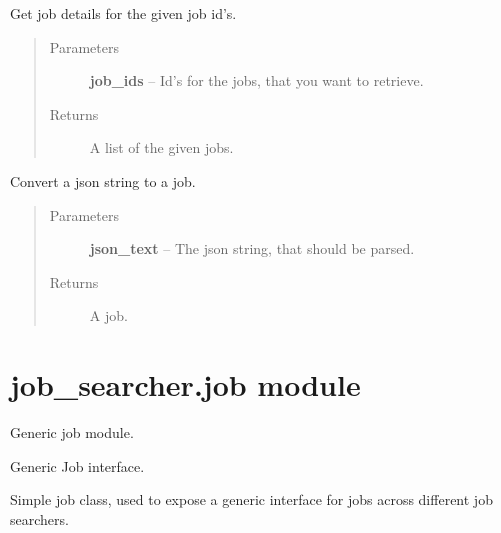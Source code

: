 \documentclass[letterpaper,10pt,english]{sphinxmanual}
\begin{document}
\begin{fulllineitems}
\begin{fulllineitems}
\label{job_searcher:job_searcher.go_jobs.GoJobs.get_details_for_jobs}
Get job details for the given job id's.
\begin{quote}\begin{description}
\item[{Parameters}] \leavevmode
\textbf{job\_ids} -- Id's for the jobs, that you want to retrieve.

\item[{Returns}] \leavevmode
A list of the given jobs.

\end{description}\end{quote}

\end{fulllineitems}


\begin{fulllineitems}
\label{job_searcher:job_searcher.go_jobs.GoJobs.json_to_job}
Convert a json string to a job.
\begin{quote}\begin{description}
\item[{Parameters}] \leavevmode
\textbf{json\_text} -- The json string, that should be parsed.

\item[{Returns}] \leavevmode
A job.

\end{description}\end{quote}

\end{fulllineitems}


\end{fulllineitems}



\section{job\_searcher.job module}
\label{job_searcher:module-job_searcher.job}\label{job_searcher:job-searcher-job-module}
Generic job module.

\begin{fulllineitems}
\label{job_searcher:job_searcher.job.Job}
Generic Job interface.

Simple job class, used to expose a generic interface for jobs
across different job searchers.

\end{fulllineitems}
\end{document}

